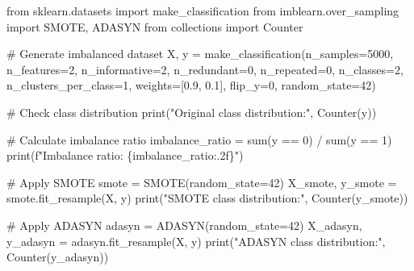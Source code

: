 \documentclass[
  letterpaper,
  DIV=11,
  numbers=noendperiod]{scrreprt}
\newenvironment{Shaded}{\begin{snugshade}}{\end{snugshade}}
\newcommand{\BuiltInTok}[1]{\textcolor[rgb]{0.00,0.23,0.31}{#1}}
\newcommand{\CommentTok}[1]{\textcolor[rgb]{0.37,0.37,0.37}{#1}}
\newcommand{\DecValTok}[1]{\textcolor[rgb]{0.68,0.00,0.00}{#1}}
\newcommand{\FloatTok}[1]{\textcolor[rgb]{0.68,0.00,0.00}{#1}}
\newcommand{\ImportTok}[1]{\textcolor[rgb]{0.00,0.46,0.62}{#1}}
\newcommand{\NormalTok}[1]{\textcolor[rgb]{0.00,0.23,0.31}{#1}}
\newcommand{\OperatorTok}[1]{\textcolor[rgb]{0.37,0.37,0.37}{#1}}
\newcommand{\SpecialCharTok}[1]{\textcolor[rgb]{0.37,0.37,0.37}{#1}}
\newcommand{\SpecialStringTok}[1]{\textcolor[rgb]{0.13,0.47,0.30}{#1}}
\newcommand{\StringTok}[1]{\textcolor[rgb]{0.13,0.47,0.30}{#1}}
\begin{document}
\begin{Shaded}
\begin{Highlighting}[]
\ImportTok{from}\NormalTok{ sklearn.datasets }\ImportTok{import}\NormalTok{ make\_classification}
\ImportTok{from}\NormalTok{ imblearn.over\_sampling }\ImportTok{import}\NormalTok{ SMOTE, ADASYN}
\ImportTok{from}\NormalTok{ collections }\ImportTok{import}\NormalTok{ Counter}

\CommentTok{\# Generate imbalanced dataset}
\NormalTok{X, y }\OperatorTok{=}\NormalTok{ make\_classification(n\_samples}\OperatorTok{=}\DecValTok{5000}\NormalTok{, n\_features}\OperatorTok{=}\DecValTok{2}\NormalTok{, n\_informative}\OperatorTok{=}\DecValTok{2}\NormalTok{, }
\NormalTok{                          n\_redundant}\OperatorTok{=}\DecValTok{0}\NormalTok{, n\_repeated}\OperatorTok{=}\DecValTok{0}\NormalTok{, n\_classes}\OperatorTok{=}\DecValTok{2}\NormalTok{, }
\NormalTok{                          n\_clusters\_per\_class}\OperatorTok{=}\DecValTok{1}\NormalTok{, }
\NormalTok{                          weights}\OperatorTok{=}\NormalTok{[}\FloatTok{0.9}\NormalTok{, }\FloatTok{0.1}\NormalTok{], flip\_y}\OperatorTok{=}\DecValTok{0}\NormalTok{, random\_state}\OperatorTok{=}\DecValTok{42}\NormalTok{)}

\CommentTok{\# Check class distribution}
\BuiltInTok{print}\NormalTok{(}\StringTok{"Original class distribution:"}\NormalTok{, Counter(y))}

\CommentTok{\# Calculate imbalance ratio}
\NormalTok{imbalance\_ratio }\OperatorTok{=} \BuiltInTok{sum}\NormalTok{(y }\OperatorTok{==} \DecValTok{0}\NormalTok{) }\OperatorTok{/} \BuiltInTok{sum}\NormalTok{(y }\OperatorTok{==} \DecValTok{1}\NormalTok{)}
\BuiltInTok{print}\NormalTok{(}\SpecialStringTok{f"Imbalance ratio: }\SpecialCharTok{\{}\NormalTok{imbalance\_ratio}\SpecialCharTok{:.2f\}}\SpecialStringTok{"}\NormalTok{)}

\CommentTok{\# Apply SMOTE}
\NormalTok{smote }\OperatorTok{=}\NormalTok{ SMOTE(random\_state}\OperatorTok{=}\DecValTok{42}\NormalTok{)}
\NormalTok{X\_smote, y\_smote }\OperatorTok{=}\NormalTok{ smote.fit\_resample(X, y)}
\BuiltInTok{print}\NormalTok{(}\StringTok{"SMOTE class distribution:"}\NormalTok{, Counter(y\_smote))}

\CommentTok{\# Apply ADASYN}
\NormalTok{adasyn }\OperatorTok{=}\NormalTok{ ADASYN(random\_state}\OperatorTok{=}\DecValTok{42}\NormalTok{)}
\NormalTok{X\_adasyn, y\_adasyn }\OperatorTok{=}\NormalTok{ adasyn.fit\_resample(X, y)}
\BuiltInTok{print}\NormalTok{(}\StringTok{"ADASYN class distribution:"}\NormalTok{, Counter(y\_adasyn))}


\end{Highlighting}
\end{Shaded}
\end{document}
